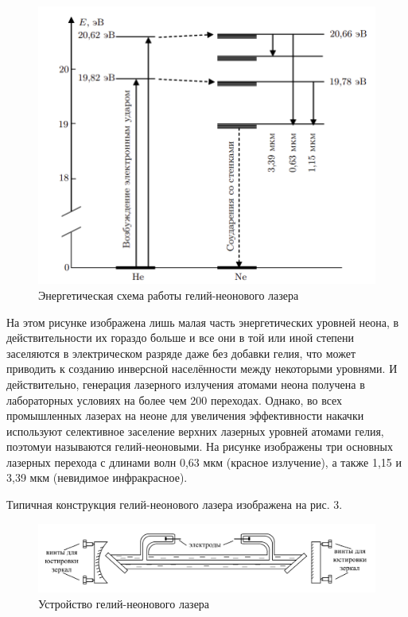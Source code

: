 \documentclass[a4paper,12pt]{article}
\theoremstyle{definition}
\begin{document}
\begin{figure}[H]
	\centering
	\includegraphics[scale=0.4]{laser2.png}
	\caption{Энергетическая схема работы гелий-неонового лазера} \label{scheme_helium}
\end{figure}

\par На этом рисунке изображена лишь малая часть энергетических уровней неона, в действительности их 
гораздо больше и все они в той или иной степени заселяются в электрическом разряде даже без добавки 
гелия, что может приводить к созданию инверсной населённости между некоторыми уровнями. И 
действительно, генерация лазерного излучения атомами неона получена в лабораторных условиях
на более чем 200 переходах. Однако, во всех промышленных лазерах на неоне для увеличения 
эффективности накачки используют селективное заселение верхних лазерных уровней атомами гелия, 
поэтомуи называются гелий-неоновыми. На рисунке изображены три основных лазерных
перехода с длинами волн 0,63 мкм (красное излучение), а также 1,15 и 3,39 мкм (невидимое 
инфракрасное). 

\par Типичная конструкция гелий-неонового лазера изображена на рис. 3.

\begin{figure}[H]
	\centering
	\includegraphics[scale=0.4]{laser3.png}
	\caption{Устройство гелий-неонового лазера} \label{scheme}
\end{figure}
\end{document}
